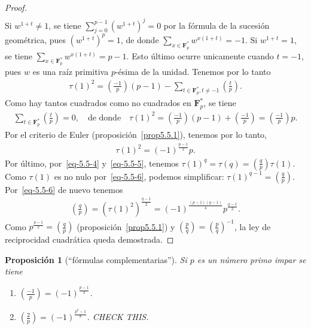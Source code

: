 \documentclass[10pt,oneside,bibtotoc,smallheadings,leqno,a5paper,DIV=12]{scrbook}
\newcommand{\FF}{\mathbf{F}}
\newcommand{\leg}[2]{\left(\frac{#1}{#2}\right)}
\numberwithin{equation}{section}
\theoremstyle{defi}
\theoremstyle{enonce}
\newtheorem{proposition}{Proposici\'on}
\theoremstyle{rem}
\numberwithin{theorem}{section}
\numberwithin{proposition}{section}
\numberwithin{definition}{section}
\numberwithin{lemma}{section}
\numberwithin{corollary}{section}
\numberwithin{example}{section}
\numberwithin{footnote}{section}%
\begin{document}
\begin{proof}
\begin{gather*}
\end{gather*}
Si $w^{1+t}\neq 1$, se tiene $\sum_{j=0}^{p-1}(w^{1+t})^{j}=0$ por la f\'ormula de la sucesi\'on geom\'etrica,
pues $(w^{1+t})^{p}=1$, de donde $\sum_{x\in\FF_{p}^{*}}w^{x(1+t)}=-1$. Si $w^{1+t}=1$, se tiene
$\sum_{x\in\FF_{p}^{*}}w^{x(1+t)}=p-1$. Esto \'ultimo ocurre unicamente cuando $t=-1$, pues
$w$ es una ra\'iz primitiva $p$-\'esima de la unidad. Tenemos por lo tanto
\begin{gather*}
\tau(1)^{2}=\leg{-1}{p}(p-1)-\sum_{t\in\FF_{p}^{*}, t\neq -1}\leg{t}{p}.
\end{gather*}
Como hay tantos cuadrados como no cuadrados en $\FF_{p}^{*}$, se tiene
\begin{gather*}
\sum_{t\in\FF_{p}^{*}}\leg{t}{p}=0,\quad\text{de donde}\quad\tau(1)^{2}=\leg{-1}{p}(p-1)+\leg{-1}{p}=\leg{-1}{p}p.
\end{gather*}
Por el criterio de Euler (proposici\'on~\ref{prop5.5.1}), tenemos por lo tanto,
\begin{gather}\label{eq-5.5-6}
\tau(1)^{2}=(-1)^{\frac{p-1}{2}}p.
\end{gather}
Por \'ultimo, por~\eqref{eq-5.5-4} y~\eqref{eq-5.5-5}, tenemos $\tau(1)^{q}=\tau(q)=\leg{q}{p}\tau(1)$. Como
$\tau(1)$ es no nulo por~\eqref{eq-5.5-6}, podemos simplificar: $\tau(1)^{q-1}=\leg{q}{p}$. Por~\eqref{eq-5.5-6}
de nuevo tenemos
\begin{gather*}
\leg{q}{p}=(\tau(1)^{2})^{\frac{q-1}{2}}=(-1)^{\frac{(p-1)(q-1)}{4}}p^{\frac{q-1}{2}}.
\end{gather*}
Como $p^{\frac{q-1}{2}}=\leg{q}{p}$ (proposici\'on~\ref{prop5.5.1})
y $\leg{p}{q} = \leg{p}{q}^{-1}$, la ley de reciprocidad
cuadr\'atica queda demostrada.
\end{proof}

\begin{proposition}[``f\'ormulas complementarias'']\label{prop5.5.2}
Si $p$ es un n\'umero primo impar se tiene
\begin{enumerate}
\item $\leg{-1}{p}=(-1)^{\frac{p-1}{2}}$.
\item $\leg{2}{p} = (-1)^{\frac{p^{2}-1}{8}}$. CHECK THIS.
\end{enumerate}
\end{proposition}
\end{document}
